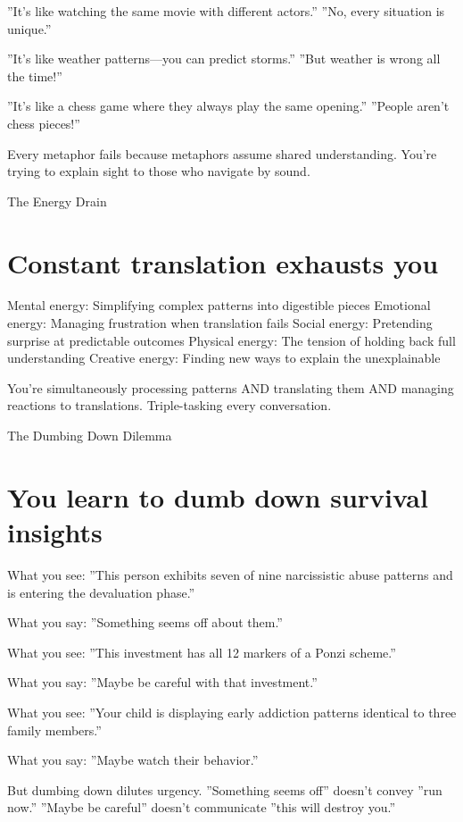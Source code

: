 \documentclass[12pt,oneside]{book}
\begin{document}
''It's like watching the same movie with different actors.'' ''No, every situation is unique.''

''It's like weather patterns---you can predict storms.'' ''But weather is wrong all the time!''

''It's like a chess game where they always play the same opening.'' ''People aren't chess pieces!''

Every metaphor fails because metaphors assume shared understanding. You're trying to explain sight to those who navigate by sound.

The Energy Drain

\section{Constant translation exhausts you}

Mental energy: Simplifying complex patterns into digestible pieces Emotional energy: Managing frustration when translation fails Social energy: Pretending surprise at predictable outcomes Physical energy: The tension of holding back full understanding Creative energy: Finding new ways to explain the unexplainable

You're simultaneously processing patterns AND translating them AND managing reactions to translations. Triple-tasking every conversation.

The Dumbing Down Dilemma

\section{You learn to dumb down survival insights}

What you see: ''This person exhibits seven of nine narcissistic abuse patterns and is entering the devaluation phase.''

What you say: ''Something seems off about them.''

What you see: ''This investment has all 12 markers of a Ponzi scheme.''

What you say: ''Maybe be careful with that investment.''

What you see: ''Your child is displaying early addiction patterns identical to three family members.''

What you say: ''Maybe watch their behavior.''

But dumbing down dilutes urgency. ''Something seems off'' doesn't convey ''run now.'' ''Maybe be careful'' doesn't communicate ''this will destroy you.''
\end{document}
